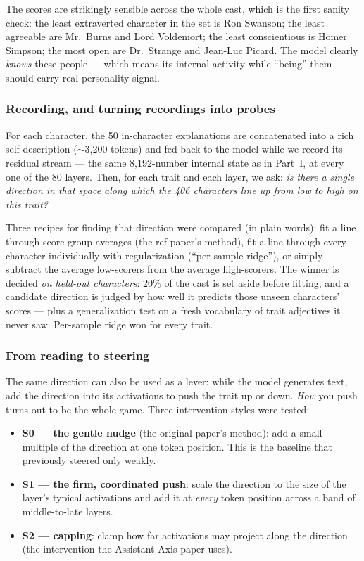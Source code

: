 \documentclass[11pt]{article}
\begin{document}
The scores are strikingly sensible across the whole cast, which is the first
sanity check: the least extraverted character in the set is Ron Swanson; the
least agreeable are Mr.~Burns and Lord Voldemort; the least conscientious is
Homer Simpson; the most open are Dr.~Strange and Jean-Luc Picard. The model
clearly \emph{knows} these people --- which means its internal activity while
``being'' them should carry real personality signal.

\subsubsection{Recording, and turning recordings into probes}

For each character, the 50 in-character explanations are concatenated into a
rich self-description ($\sim$3{,}200 tokens) and fed back to the model while we
record its residual stream --- the same 8{,}192-number internal state as in
Part~I, at every one of the 80 layers. Then, for each trait and each layer, we
ask: \emph{is there a single direction in that space along which the 406
characters line up from low to high on this trait?}

Three recipes for finding that direction were compared (in plain words): fit a
line through score-group averages (the ref paper's method), fit a line
through every character individually with regularization (``per-sample
ridge''), or simply subtract the average low-scorers from the average
high-scorers. The winner is decided \emph{on held-out characters}: 20\% of the
cast is set aside before fitting, and a candidate direction is judged by how
well it predicts those unseen characters' scores --- plus a generalization test
on a fresh vocabulary of trait adjectives it never saw. Per-sample ridge won for
every trait.

\subsubsection{From reading to steering}

The same direction can also be used as a lever: while the
model generates text, add the direction into its activations to push the trait
up or down. \emph{How} you push turns out to be the whole game. Three
intervention styles were tested:

\begin{itemize}
  \item \textbf{S0 --- the gentle nudge} (the original paper's method): add a
        small multiple of the direction at one token position. This is the
        baseline that previously steered only weakly.
  \item \textbf{S1 --- the firm, coordinated push}: scale the direction to the
        size of the layer's typical activations and add it at \emph{every} token
        position across a band of middle-to-late layers.
  \item \textbf{S2 --- capping}: clamp how far activations may project along the
        direction (the intervention the Assistant-Axis paper uses).
\end{itemize}
\end{document}
